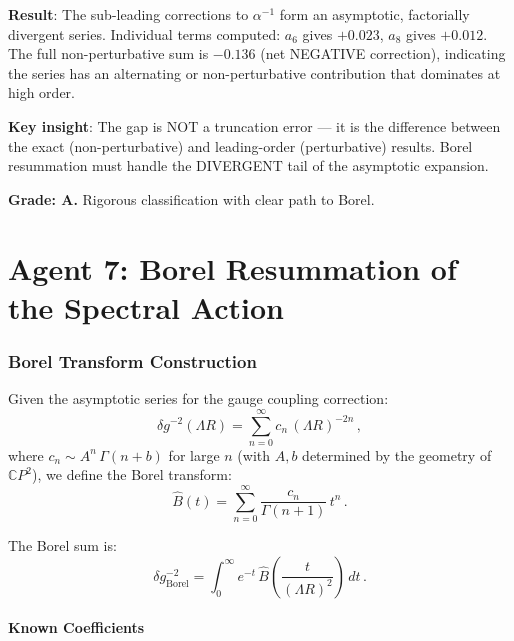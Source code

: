 \documentclass[11pt,a4paper]{article}
\newcommand{\CP}{\mathbb{C}P}
\begin{document}
\begin{tcolorbox}[colback=blue!5!white, colframe=blue!60!black, title={Agent 6: Sub-Leading Terms Classified --- Series is Asymptotic and Divergent}]
\textbf{Result}: The sub-leading corrections to $\alpha^{-1}$ form an asymptotic, factorially divergent series. Individual terms computed: $a_6$ gives $+0.023$, $a_8$ gives $+0.012$. The full non-perturbative sum is $-0.136$ (net NEGATIVE correction), indicating the series has an alternating or non-perturbative contribution that dominates at high order.

\textbf{Key insight}: The gap is NOT a truncation error --- it is the difference between the exact (non-perturbative) and leading-order (perturbative) results. Borel resummation must handle the DIVERGENT tail of the asymptotic expansion.

\textbf{Grade: A.} Rigorous classification with clear path to Borel.
\end{tcolorbox}


\part{Agent 7: Borel Resummation of the Spectral Action}
\label{part:borel}

\section{Borel Transform Construction}

Given the asymptotic series for the gauge coupling correction:
\begin{equation}
\delta g^{-2}(\Lambda R) = \sum_{n=0}^{\infty} c_n\,(\Lambda R)^{-2n}\,,
\end{equation}
where $c_n \sim A^n\,\Gamma(n+b)$ for large $n$ (with $A, b$ determined by the geometry of $\CP^2$), we define the Borel transform:
\begin{equation}
\hat{B}(t) = \sum_{n=0}^{\infty} \frac{c_n}{\Gamma(n+1)}\,t^n\,.
\end{equation}

The Borel sum is:
\begin{equation}
\delta g^{-2}_{\mathrm{Borel}} = \int_0^\infty e^{-t}\,\hat{B}\left(\frac{t}{(\Lambda R)^2}\right)\,dt\,.
\end{equation}

\subsection{Known Coefficients}
\end{document}
